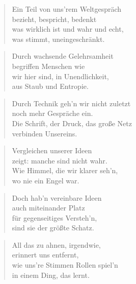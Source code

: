 \documentclass[10pt,a4paper]{article}
\begin{document}
\begin{multicols}{2}
\begin{verse}
Ein Teil von uns’rem Weltgespräch \\
bezieht, bespricht, bedenkt \\
was wirklich ist und wahr und echt, \\
was stimmt, uneingeschränkt. \\
\end{verse}

\begin{verse}
Durch wachsende Gelehrsamheit \\
begriffen Menschen wie \\
wir hier sind, in Unendlichkeit, \\
aus Staub und Entropie. \\
\end{verse}

\begin{verse}
Durch Technik geh’n wir nicht zuletzt \\
noch mehr Gespräche ein. \\
Die Schrift, der Druck, das große Netz \\
verbinden Unsereins. \\
\end{verse}

\begin{verse}
Vergleichen unserer Ideen \\
zeigt: manche sind nicht wahr. \\
Wie Himmel, die wir klarer seh’n, \\
wo nie ein Engel war. \\
\end{verse}

\begin{verse}
Doch hab’n vereinbare Ideen \\
auch miteinander Platz \\
für gegenseitiges Versteh’n, \\
sind sie der größte Schatz. \\
\end{verse}

\begin{verse}
All das zu ahnen, irgendwie, \\
erinnert uns entfernt, \\
wie uns’re Stimmen Rollen spiel’n \\
in einem Ding, das lernt. \\
\end{verse}


\end{multicols}
\end{document}
